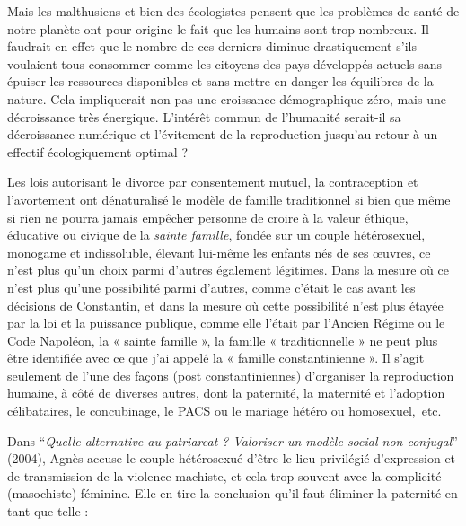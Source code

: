  Mais les malthusiens et bien des écologistes pensent que les problèmes de santé de notre planète ont pour origine le fait que les humains sont trop nombreux. Il faudrait en effet que le nombre de ces derniers diminue drastiquement s'ils voulaient tous consommer comme les citoyens des pays développés actuels sans épuiser les ressources disponibles et sans mettre en danger les équilibres de la nature. Cela impliquerait non pas une croissance démographique zéro, mais une décroissance très énergique. L'intérêt commun de l'humanité serait-il sa décroissance numérique et l'évitement de la reproduction jusqu'au retour à un effectif écologiquement optimal ? 
 




Les lois autorisant le divorce par consentement mutuel, la contraception et l'avortement ont dénaturalisé le modèle de famille traditionnel si bien que même si rien ne pourra jamais empêcher personne de croire à la valeur éthique, éducative ou civique de la {\emph{sainte famille}}, fondée sur un couple hétérosexuel, monogame et indissoluble, élevant lui-même les enfants nés de ses œuvres, ce n'est plus qu'un choix parmi d'autres également légitimes. Dans la mesure où ce n'est plus qu'une possibilité parmi d'autres, comme c'était le cas avant les décisions de Constantin, et dans la mesure où cette possibilité n'est plus étayée par la loi et la puissance publique, comme elle l'était par l'Ancien Régime ou le Code Napoléon, la « sainte famille », la famille « traditionnelle » ne peut plus être identifiée avec ce que j'ai appelé la « famille constantinienne ». Il s'agit seulement de l'une des façons (post constantiniennes) d'organiser la reproduction humaine, à côté de diverses autres, dont la paternité, la maternité et l'adoption célibataires, le concubinage, le PACS ou le mariage hétéro ou homosexuel,~etc.

Dans \enquote{\emph{Quelle alternative au patriarcat ? Valoriser un modèle social non conjugal}} (2004), Agnès  accuse le couple hétérosexué d'être le lieu privilégié d'expression et de transmission de la violence machiste, et cela trop souvent avec la complicité (masochiste) féminine. Elle en tire la conclusion qu'il faut éliminer la paternité en tant que telle :

